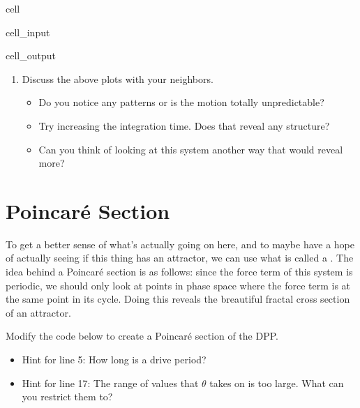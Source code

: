 \documentclass[letterpaper,10pt,english]{jupyterBook}
\begin{document}
\begin{sphinxuseclass}{cell}
\begin{sphinxVerbatimInput}
\begin{sphinxuseclass}{cell_input}
\end{sphinxuseclass}\end{sphinxVerbatimInput}
\begin{sphinxVerbatimOutput}

\begin{sphinxuseclass}{cell_output}
\noindent{}

\end{sphinxuseclass}\end{sphinxVerbatimOutput}

\end{sphinxuseclass}
\sphinxAtStartPar
{}
\begin{enumerate}
%
\item {} 
\sphinxAtStartPar
Discuss the above plots with your neighbors.
\begin{itemize}
\item {} 
\sphinxAtStartPar
Do you notice any patterns or is the motion totally unpredictable?

\item {} 
\sphinxAtStartPar
Try increasing the integration time. Does that reveal any structure?

\item {} 
\sphinxAtStartPar
Can you think of looking at this system another way that would reveal more?

\end{itemize}

\end{enumerate}


\section{Poincaré Section}
\label{\detokenize{content/1_mechanics/CHAOS:poincare-section}}
\sphinxAtStartPar
To get a better sense of what’s actually going on here, and to maybe have a hope of actually seeing if this thing has an attractor, we can use what is called a . The idea behind a Poincaré section is as follows: since the force term of this system is periodic, we should only look at points in phase space where the force term is at the same point in its cycle. Doing this reveals the breautiful fractal cross section of an attractor.

\sphinxAtStartPar
{}

\sphinxAtStartPar
Modify the code below to create a Poincaré section of the DPP.
\begin{itemize}
\item {} 
\sphinxAtStartPar
Hint for line 5: How long is a drive period?

\item {} 
\sphinxAtStartPar
Hint for line 17: The range of values that \(\theta\) takes on is too large. What can you restrict them to?

\end{itemize}
\end{document}
